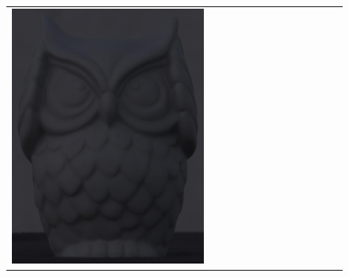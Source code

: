 \begin{figure}[!ht]
\begin{tabular}{@{}rcccccccccccc@{}}
    \includegraphics[width=\customwidth]{./figures/reconstruction/object/153215.jpg} &

\end{tabular}
\end{figure}
